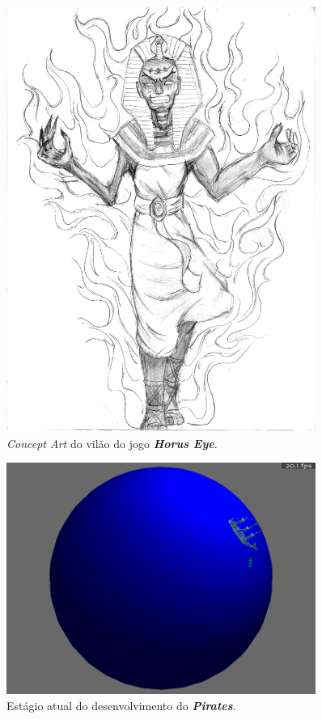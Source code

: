 \documentclass[12pt,onecolumn,a4paper]{article}
\begin{document}
        \begin{figure}[htb]
            \centering
            \includegraphics[width=0.9\textwidth]{images/concept_pharaoh.jpg}
            \caption{\textit{Concept Art} do vilão do jogo \textit{\textbf{Horus Eye}}.}
            \label{fig:concept_03}
        \end{figure}
        
    
        \begin{figure}[htb]
            \centering
            \includegraphics[width=0.9\textwidth]{images/pirates_01.png}
            \caption{Estágio atual do desenvolvimento do \textit{\textbf{Pirates}}.}
            \label{fig:pirates_01}
        \end{figure}
    
\end{document}
